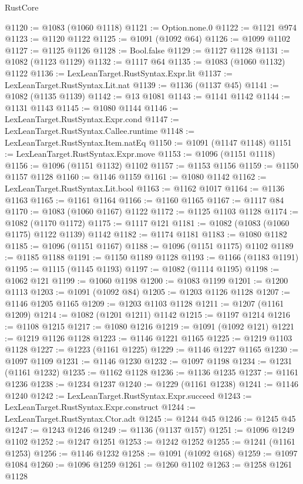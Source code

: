 \begin{lexlean}{RustCore}
\begin{coremodule}
@1120 := @1083 (@1060 @1118)
@1121 := Option.none.{0}
@1122 := @1121 @974
@1123 := @1120 @1122
@1125 := @1091 (@1092 @64)
@1126 := @1099 @1102
@1127 := @1125 @1126
@1128 := Bool.false
@1129 := @1127 @1128
@1131 := @1082 (@1123 @1129)
@1132 := @1117 @64
@1135 := @1083 (@1060 @1132) @1122
@1136 := LexLeanTarget.RustSyntax.Expr.lit
@1137 := LexLeanTarget.RustSyntax.Lit.nat
@1139 := @1136 (@1137 @45)
@1141 := @1082 (@1135 @1139)
@1142 := @13 @1081
@1143 := @1141 @1142
@1144 := @1131 @1143
@1145 := @1080 @1144
@1146 := LexLeanTarget.RustSyntax.Expr.cond
@1147 := LexLeanTarget.RustSyntax.Callee.runtime
@1148 := LexLeanTarget.RustSyntax.Item.natEq
@1150 := @1091 (@1147 @1148)
@1151 := LexLeanTarget.RustSyntax.Expr.move
@1153 := @1096 (@1151 @1118)
@1156 := @1096 (@1151 @1132) @1102
@1157 := @1153 @1156
@1159 := @1150 @1157 @1128
@1160 := @1146 @1159
@1161 := @1080 @1142
@1162 := LexLeanTarget.RustSyntax.Lit.bool
@1163 := @1162 @1017
@1164 := @1136 @1163
@1165 := @1161 @1164
@1166 := @1160 @1165
@1167 := @1117 @84
@1170 := @1083 (@1060 @1167) @1122
@1172 := @1125 @1103 @1128
@1174 := @1082 (@1170 @1172)
@1175 := @1117 @121
@1181 := @1082 (@1083 (@1060 @1175) @1122 @1139) @1142
@1182 := @1174 @1181
@1183 := @1080 @1182
@1185 := @1096 (@1151 @1167)
@1188 := @1096 (@1151 @1175) @1102
@1189 := @1185 @1188
@1191 := @1150 @1189 @1128
@1193 := @1166 (@1183 @1191)
@1195 := @1115 (@1145 @1193)
@1197 := @1082 (@1114 @1195)
@1198 := @1062 @121
@1199 := @1060 @1198
@1200 := @1083 @1199
@1201 := @1200 @1113
@1203 := @1091 (@1092 @84)
@1205 := @1203 @1126 @1128
@1207 := @1146 @1205 @1165
@1209 := @1203 @1103 @1128
@1211 := @1207 (@1161 @1209)
@1214 := @1082 (@1201 @1211) @1142
@1215 := @1197 @1214
@1216 := @1108 @1215
@1217 := @1080 @1216
@1219 := @1091 (@1092 @121)
@1221 := @1219 @1126 @1128
@1223 := @1146 @1221 @1165
@1225 := @1219 @1103 @1128
@1227 := @1223 (@1161 @1225)
@1229 := @1146 @1227 @1165
@1230 := @1097 @1109
@1231 := @1146 @1230
@1232 := @1097 @1198
@1234 := @1231 (@1161 @1232)
@1235 := @1162 @1128
@1236 := @1136 @1235
@1237 := @1161 @1236
@1238 := @1234 @1237
@1240 := @1229 (@1161 @1238)
@1241 := @1146 @1240
@1242 := LexLeanTarget.RustSyntax.Expr.succeed
@1243 := LexLeanTarget.RustSyntax.Expr.construct
@1244 := LexLeanTarget.RustSyntax.Ctor.adt
@1245 := @1244 @45
@1246 := @1245 @45
@1247 := @1243 @1246
@1249 := @1136 (@1137 @157)
@1251 := @1096 @1249 @1102
@1252 := @1247 @1251
@1253 := @1242 @1252
@1255 := @1241 (@1161 @1253)
@1256 := @1146 @1232
@1258 := @1091 (@1092 @168)
@1259 := @1097 @1084
@1260 := @1096 @1259
@1261 := @1260 @1102
@1263 := @1258 @1261 @1128

\end{coremodule}
\end{lexlean}
